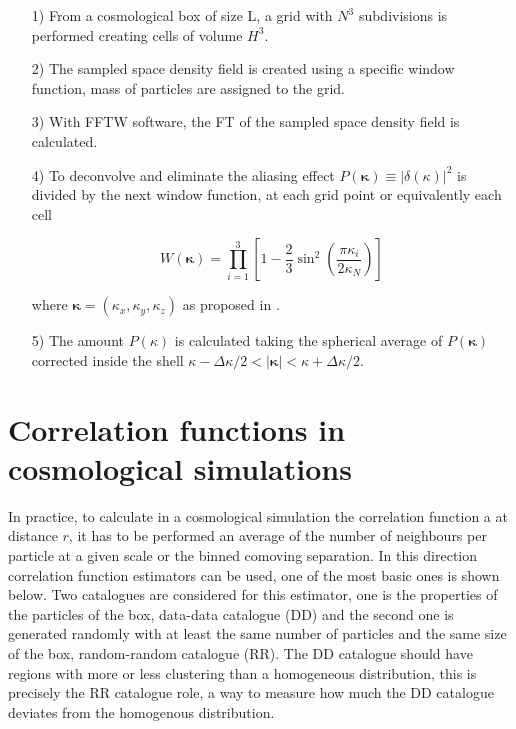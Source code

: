 \begin{enumerate}

\item[1)] From a cosmological box of size L, a grid with $N^3$ subdivisions is performed
creating cells of volume $H^3$. 

\item[2)] The sampled space density field is created using a specific window function,
mass of particles are assigned to the grid. 

\item[3)] With FFTW software, the FT of the sampled space density field is calculated.

\item[4)] To deconvolve and eliminate the aliasing effect $P(\boldsymbol{\kappa})\equiv |\delta(\kappa)|^2$ is divided by the next window function, at each grid point or equivalently each cell

\[ W(\boldsymbol{\kappa}) = \prod^{3}_{i=1}\left[ 1 - \frac{2}{3}\sin^2\left(\frac{\pi\kappa_i}{2\kappa_N}\right) \right] \]

where $\boldsymbol{\kappa} = (\kappa_x,\kappa_y,\kappa_z)$ as proposed in \cite{Jeong}.  

\item[5)] The amount $P(\kappa)$ is calculated taking the spherical average of 
$P(\boldsymbol{\kappa})$ corrected inside the shell 
$\kappa -\Delta\kappa/2	< |\boldsymbol{\kappa}|<\kappa +\Delta\kappa/2$.

\end{enumerate}


\section{ Correlation functions in cosmological simulations }


In practice, to calculate in a cosmological simulation the correlation function 
a at distance $r$, it has to be performed an average of the number of neighbours per 
particle at a given scale or the binned comoving separation. In this direction 
correlation function estimators can be used, one of the most basic ones is shown below. 
Two catalogues are considered for this estimator, one is the properties of the particles 
of the box, data-data catalogue (DD) and the second one is generated 
randomly with at least the same number of particles and the same size of the box, 
random-random catalogue (RR). The DD catalogue should have regions with more or
less clustering than a homogeneous distribution, this is precisely the RR catalogue role, 
a way to measure how much the DD catalogue deviates from the homogenous distribution. 

